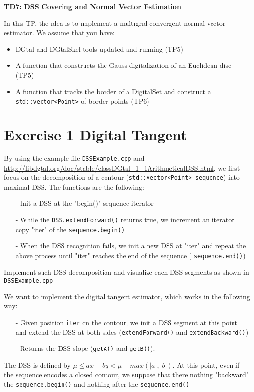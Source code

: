 \documentclass[a4paper, 11pt]{article}
\title{}
\author{}
\date{}
\begin{document}
\begin{center}
	\LARGE \textbf{TD7: DSS Covering and Normal Vector Estimation}
\end{center}

\bigskip
\par In this TP, the idea is to implement a multigrid convergent normal vector estimator. We assume that you have:
\begin{itemize}
	\item DGtal and DGtalSkel tools updated and running (TP5)
	\item A function that constructs the Gauss digitalization of an Euclidean disc (TP5)
	\item A function that tracks the border of a DigitalSet and construct a \texttt{std::vector<Point>} of border points (TP6)
\end{itemize}


\section*{Exercise 1 \rm Digital Tangent}

\par By using the example file \texttt{DSSExample.cpp} and \url{http://libdgtal.org/doc/stable/classDGtal_1_1ArithmeticalDSS.html}, we first focus on the decomposition of a contour (\texttt{std::vector<Point> sequence}) into maximal DSS. The functions are the following:
\begin{itemize}
	\item[-] Init a DSS at the "begin()" sequence iterator
	\item[-] While the \texttt{DSS.extendForward()} returns true, we increment an iterator copy "iter" of the \texttt{sequence.begin()} 
	\item[-] When the DSS recognition fails, we init a new DSS at "iter" and repeat the above process until "iter" reaches the end of the sequence ( \texttt{sequence.end()})
\end{itemize}

 Implement such DSS decomposition and visualize each DSS segments as shown in \texttt{DSSExample.cpp}

\vspace{0.7cm}
\par We want to implement the digital tangent estimator, which works in the following way:
	\begin{itemize}
	\item[-] Given position \texttt{iter} on the contour, we init a DSS segment at this point and extend the DSS at both sides (\texttt{extendForward()} and \texttt{extendBackward()})
	\item[-] Returns the DSS slope (\texttt{getA()} and \texttt{getB()}).
	\end{itemize}
 The DSS is defined by $\mu \leq ax - by <\mu + max(|a|,|b|)$. At this point, even if the sequence encodes a closed contour, we suppose that there nothing "backward" the \texttt{sequence.begin()} and nothing after the \texttt{sequence.end()}.
\end{document}
